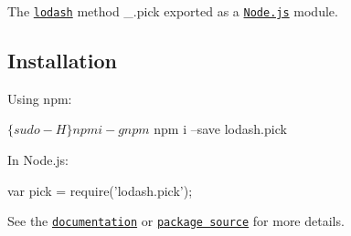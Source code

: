The \href{https://lodash.com/}{\tt lodash} method {\ttfamily \+\_\+.\+pick} exported as a \href{https://nodejs.org/}{\tt Node.\+js} module.

\subsection*{Installation}

Using npm\+: 
\begin{DoxyCode}
$ \{sudo -H\} npm i -g npm
$ npm i --save lodash.pick
\end{DoxyCode}


In Node.\+js\+: 
\begin{DoxyCode}
var pick = require('lodash.pick');
\end{DoxyCode}


See the \href{https://lodash.com/docs#pick}{\tt documentation} or \href{https://github.com/lodash/lodash/blob/4.4.0-npm-packages/lodash.pick}{\tt package source} for more details. 